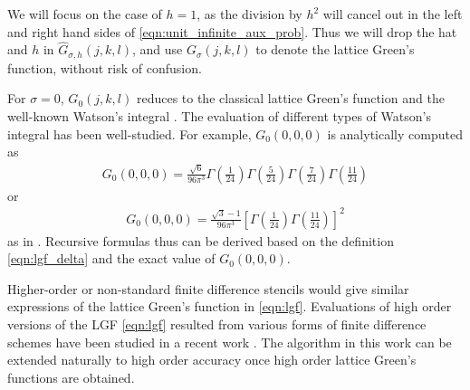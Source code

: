 We will focus on the case of $h=1$, as the division by $h^2$ will cancel out in the left and right hand sides of \eqref{eqn:unit_infinite_aux_prob}. Thus we will drop the hat and $h$ in $\widehat{G}_{\sigma,h}(j,k,l)$, and use $G_{\sigma}(j,k,l)$ to denote the lattice Green's function, without risk of confusion. 

For $\sigma=0$, $G_{0}(j,k,l)$ reduces to the classical lattice Green's function and the well-known Watson's integral \cite{joyce2005evaluation,zucker201170}. The evaluation of different types of Watson's integral has been well-studied. For example, $G_{0}(0,0,0)$ is analytically computed as
\begin{align}
G_{0}(0,0,0) = \frac{\sqrt{6}}{96\pi^3}\Gamma\left(\frac{1}{24}\right)\Gamma\left(\frac{5}{24}\right)\Gamma\left(\frac{7}{24}\right)\Gamma\left(\frac{11}{24}\right)
\end{align}
or 
\begin{align}
G_{0}(0,0,0) = \frac{\sqrt{3}-1}{96\pi^3}\left[\Gamma\left(\frac{1}{24}\right)\Gamma\left(\frac{11}{24}\right)\right]^2
\end{align}
as in \cite{zucker201170}. Recursive formulas thus can be derived based on the definition \eqref{eqn:lgf_delta} and the exact value of $G_{0}(0,0,0)$.

Higher-order or non-standard finite difference stencils would give similar expressions of the lattice Green's function in \eqref{eqn:lgf}.  Evaluations of high order versions of the LGF \eqref{eqn:lgf} resulted from various forms of finite difference schemes have been studied in a recent work \cite{gabbard2024lattice}. The algorithm in this work can be extended naturally to high order accuracy once high order lattice Green's functions are obtained.

